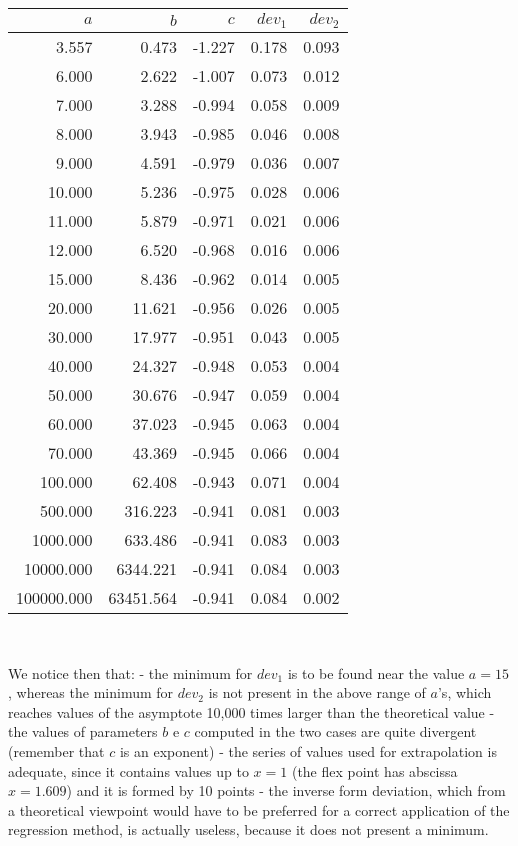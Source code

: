 \documentclass[%
 aip,
 jmp,%
 amsmath,amssymb,
 reprint,%
]{revtex4-1}
\begin{document}
{\centering
\begin{tabular}{rrrrr}
 $a$ & $b$ & $c$ & $dev_1$ & $dev_2$  \\ \hline
 3.557 & 0.473 & -1.227 & 0.178 & 0.093 \\
 6.000 & 2.622 & -1.007 & 0.073 & 0.012 \\
 7.000 & 3.288 & -0.994 & 0.058 & 0.009 \\ 
 8.000 & 3.943 & -0.985 & 0.046 & 0.008 \\
 9.000 & 4.591 & -0.979 & 0.036	& 0.007 \\ 
 10.000 & 5.236 & -0.975 & 0.028 & 0.006 \\
 11.000 & 5.879 & -0.971 & 0.021 & 0.006 \\
 12.000 & 6.520 & -0.968 & 0.016 & 0.006 \\
 15.000 & 8.436 & -0.962 & 0.014 & 0.005 \\
 20.000 & 11.621 & -0.956 & 0.026 & 0.005 \\
 30.000 & 17.977 & -0.951 & 0.043 & 0.005 \\
 40.000 & 24.327 & -0.948 & 0.053 & 0.004 \\
 50.000 & 30.676 & -0.947 & 0.059 & 0.004 \\
 60.000 & 37.023 & -0.945 & 0.063 & 0.004 \\
 70.000 & 43.369 & -0.945 & 0.066 & 0.004 \\
 100.000 & 62.408 & -0.943 & 0.071 & 0.004 \\
 500.000 & 316.223 & -0.941 & 0.081 & 0.003 \\ 
 1000.000 & 633.486 & -0.941 & 0.083 & 0.003 \\
 10000.000 & 6344.221 & -0.941 & 0.084 & 0.003 \\
 100000.000 & 63451.564 & -0.941 & 0.084 & 0.002 \\	  
\end{tabular}\\[4mm]}
	
We notice then that:
- the minimum for $dev_1$ is to be found near the value $a = 15$, whereas the minimum for $dev_2$ is not present in the above range of $a$'s, which reaches values of the asymptote 10,000 times larger than the theoretical value
- the values of parameters $b$ e $c$ computed in the two cases are quite divergent (remember that $c$ is an exponent)
- the series of values used for extrapolation is adequate, since it contains values up to $x = 1$ (the flex point has  abscissa $x =  1.609$) and it is formed by 10 points
- the inverse form deviation, which from a theoretical viewpoint would have to be preferred for a correct application of the regression method, is actually useless, because it does not present a minimum.
\end{document}
